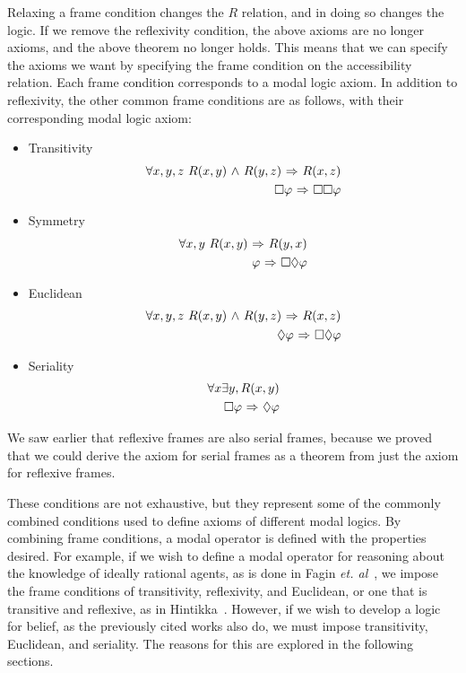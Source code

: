 Relaxing a frame condition changes the $R$ relation, and in doing so changes the logic. If we remove the reflexivity condition, the above axioms are no longer axioms, and the above theorem no longer holds. This means that we can specify the axioms we want by specifying the frame condition on the accessibility relation. Each frame condition corresponds to a modal logic axiom. In addition to reflexivity, the other common frame conditions are as follows, with their corresponding modal logic axiom:
\begin{itemize}
	\item Transitivity
	\begin{eqnarray}
	\forall x,y,z\ R(x,y) {\ \wedge \ } R(y,z) {\ \Rightarrow \ } R(x,z)\\
	\Box \varphi {\ \Rightarrow \ } \Box \Box \varphi
	\end{eqnarray}
	\item Symmetry
	\begin{eqnarray}
	\forall x,y\ R(x,y) {\ \Rightarrow \ } R(y,x)\\
	\varphi {\ \Rightarrow \ } \Box \Diamond \varphi
	\end{eqnarray}
	\item Euclidean
	\begin{eqnarray}
	\forall x,y,z\ R(x,y) {\ \wedge \ } R(y,z) {\ \Rightarrow \ } R(x,z)\\
	\Diamond \varphi {\ \Rightarrow \ } \Box \Diamond \varphi
	\end{eqnarray}
	\item Seriality
	\begin{eqnarray}
	\forall x \exists y, R(x,y) \\
	\Box \varphi {\ \Rightarrow \ } \Diamond \varphi
	\end{eqnarray}
\end{itemize}

We saw earlier that reflexive frames are also serial frames, because we proved that we could derive the axiom for serial frames as a theorem from just the axiom for reflexive frames.

These conditions are not exhaustive, but they represent some of the commonly combined conditions used to define axioms of different modal logics. By combining frame conditions, a modal operator is defined with the properties desired. For example, if we wish to define a modal operator for reasoning about the knowledge of ideally rational agents, as is done in Fagin \emph{et. al}~\cite{FHMV}, we impose the frame conditions of transitivity, reflexivity, and Euclidean, or one that is transitive and reflexive, as in Hintikka~\cite{Hintikka}. However, if we wish to develop a logic for belief, as the previously cited works also do, we must impose transitivity, Euclidean, and seriality. The reasons for this are explored in the following sections.

